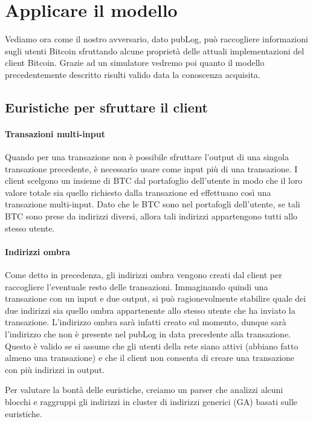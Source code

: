 \section{Applicare il modello}\label{valutazione-della-privacy-in-bitcoin}

Vediamo ora come il nostro avversario, dato pubLog, può raccogliere informazioni sugli utenti Bitcoin sfruttando alcune proprietà delle attuali implementazioni del client Bitcoin.
Grazie ad un simulatore vedremo poi quanto il modello precedentemente descritto risulti valido data la conoscenza acquisita.

\subsection{Euristiche per sfruttare il client}

\paragraph{Transazioni multi-input}

Quando per una transazione non è possibile sfruttare l'output di una singola transazione precedente, è necessario usare come input più di una transazione.
I client scelgono un insieme di BTC dal portafoglio dell'utente in modo che il loro valore totale sia quello richiesto dalla transazione ed effettuano così una transazione multi-input.
Dato che le BTC sono nel portafogli dell'utente, se tali BTC sono prese da indirizzi diversi, allora tali indirizzi appartengono tutti allo stesso utente.

\paragraph{Indirizzi ombra}

Come detto in precedenza, gli indirizzi ombra vengono creati dal client per raccogliere l'eventuale resto delle transazioni.
Immaginando quindi una transazione con un input e due output, si può ragionevolmente stabilire quale dei due indirizzi sia quello ombra appartenente allo stesso utente che ha inviato la transazione. L'indirizzo ombra sarà infatti creato sul momento, dunque sarà l'indirizzo che non è presente nel pubLog in data precedente alla transazione.
Questo è valido se si assume che gli utenti della rete siano attivi (abbiano fatto almeno una transazione) e che il client non consenta di creare una transazione con più indirizzi in output.

Per valutare la bontà delle euristiche, creiamo un parser che analizzi alcuni blocchi e raggruppi gli indirizzi in cluster di indirizzi generici (GA) basati sulle euristiche.

